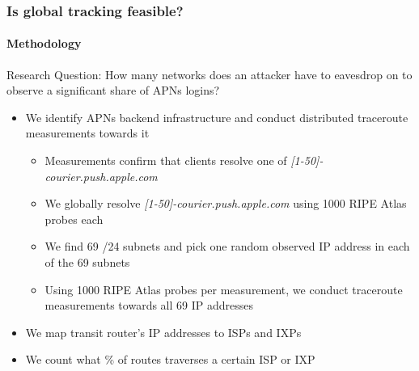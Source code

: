 \begin{frame}
	\frametitle{Is global tracking feasible?}
	\framesubtitle{Methodology}
	Research Question: How many networks does an attacker have to eavesdrop on to observe a significant share of APNs logins?
	\begin{itemize}
		\item We identify APNs backend infrastructure and conduct distributed traceroute \\ measurements towards it
		\begin{itemize}
		\item Measurements confirm that clients resolve one of \textit{[1-50]-courier.push.apple.com}
		\item We globally resolve \textit{[1-50]-courier.push.apple.com} using 1000 RIPE Atlas probes each
		\item We find 69 /24 subnets and pick one random observed IP address in each of the 69 subnets
		\item Using 1000 RIPE Atlas probes per measurement, we conduct traceroute measurements towards all 69 IP addresses
		\end{itemize}
		\item We map transit router's IP addresses to ISPs and IXPs
		\item We count what \% of routes traverses a certain ISP or IXP
	\end{itemize}	
\end{frame}









